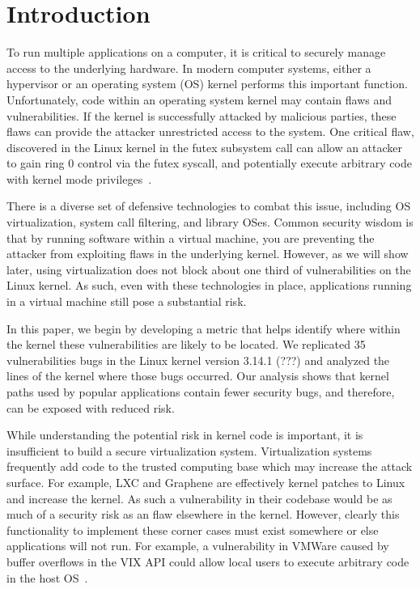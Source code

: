 \section{Introduction}
\label{sec.introduction}

To run multiple applications on a computer, it is critical to securely
manage access to the underlying hardware. In modern computer systems,
either a hypervisor or an operating system (OS) kernel performs this
important function. Unfortunately, code within an operating system kernel
may contain flaws and vulnerabilities. If the kernel is successfully
attacked by malicious parties, these flaws can provide the attacker
unrestricted access to the system. One critical flaw, discovered in the
Linux kernel in the futex subsystem call can allow an attacker to gain ring
0 control via the futex syscall, and potentially execute arbitrary code
with kernel mode privileges~\cite{CVE-2014-3153}. 

There is a diverse set of defensive technologies to combat this issue,
including OS virtualization, system call filtering, and library OSes.
Common security wisdom is that by running software within a virtual
machine, you are preventing the attacker from exploiting flaws in the
underlying kernel.  However, as we will show later, using virtualization
does not block about one third of vulnerabilities on the Linux kernel.  As
such, even with these technologies in place, applications running in a
virtual machine still pose a substantial risk.

In this paper, we begin by developing a metric that helps identify where
within the kernel these vulnerabilities are likely to be located. We
replicated 35 vulnerabilities bugs in the Linux kernel version 3.14.1 (???)
and analyzed the lines of the kernel where those bugs occurred.  Our
analysis shows that kernel paths used by popular applications contain fewer
security bugs, and therefore, can be exposed with reduced risk. 

While understanding the potential risk in kernel code is important, it is
insufficient to build a secure virtualization system.  Virtualization
systems frequently add code to the trusted computing base which may
increase the attack surface.  For example, LXC and Graphene are effectively
kernel patches to Linux and increase the kernel.  As such a vulnerability
in their codebase would be as much of a security risk as an flaw elsewhere
in the kernel.  However, clearly this functionality to implement these
corner cases must exist somewhere or else applications will not run. For
example, a vulnerability in VMWare caused by buffer overflows in the VIX
API could allow local users to execute arbitrary code in the host
OS~\cite{CVE-2008-2100}.  

